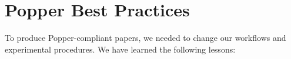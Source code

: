 %
%
%
%
%


\section{Popper Best Practices}

To produce Popper-compliant papers, we needed to change our workflows and
experimental procedures. We have learned the following lessons:

